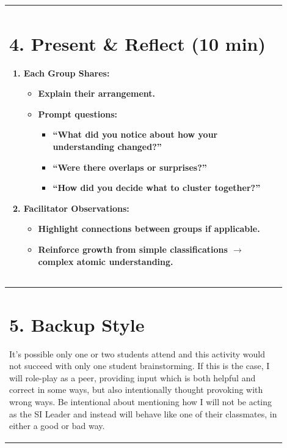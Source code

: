 \documentclass{article}
\begin{document}
\begin{flushleft}
\begin{tabular}{|p{0.9\linewidth}|}
\hline
\end{tabular}
\newpage


\begin{tabular}{|p{0.9\linewidth}|}
\hline
\section*{4. Present \& Reflect (10 min)}
\begin{enumerate}[label=\arabic*.]
    \item \textbf{Each Group Shares:}
    \begin{itemize}
        \item Explain their arrangement.
        \item Prompt questions:
        \begin{itemize}
            \item ``What did you notice about how your understanding changed?''
            \item ``Were there overlaps or surprises?''
            \item ``How did you decide what to cluster together?''
        \end{itemize}
    \end{itemize}
    \item \textbf{Facilitator Observations:}
    \begin{itemize}
        \item Highlight connections between groups if applicable.
        \item Reinforce growth from simple classifications $\rightarrow$ complex atomic understanding.
    \end{itemize}
\end{enumerate} \\

\hline
\end{tabular}
\newpage

\begin{tabular}{|p{0.9\linewidth}|}
\hline

\section*{5. Backup Style}
It's possible only one or two students attend and this activity would not succeed with only one student brainstorming.
If this is the case, I will role-play as a peer, providing input which is both helpful and correct in some ways, but also intentionally thought provoking with wrong ways.
Be intentional about mentioning how I will not be acting as the SI Leader and instead will behave like one of their classmates, in either a good or bad way.


\end{tabular}
\end{flushleft}
\end{document}
